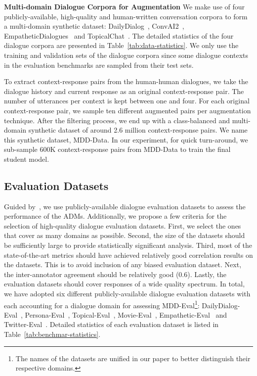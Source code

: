 \documentclass[letterpaper]{article} \usepackage{aaai22}  \usepackage{times}  \usepackage{helvet}  \usepackage{courier}  \usepackage[hyphens]{url}  \usepackage{graphicx} \urlstyle{rm} \def\UrlFont{\rm}  \usepackage{natbib}  \usepackage{caption} \DeclareCaptionStyle{ruled}{labelfont=normalfont,labelsep=colon,strut=off} \frenchspacing  \setlength{\pdfpagewidth}{8.5in}  \setlength{\pdfpageheight}{11in}  \usepackage{algorithm}
\begin{document}
\bigskip
\noindent\textbf{Multi-domain Dialogue Corpora for Augmentation}
We make use of four publicly-available, high-quality and human-written conversation corpora to form a multi-domain synthetic dataset: DailyDialog~\citep{li-etal-2017-dailydialog}, ConvAI2~\citep{dinan2020second}, EmpatheticDialogues~\citep{rashkin-etal-2019-towards} and TopicalChat~\citep{gopalakrishnan2019topical}. The detailed statistics of the four dialogue corpora are presented in Table~\ref{tab:data-statistics}.  We only use the training and validation sets of the dialogue corpora since some dialogue contexts in the evaluation benchmarks are sampled from their test sets.

To extract context-response pairs from the human-human dialogues, we take the dialogue history and current response as an original context-response pair. The number of utterances per context is kept between one and four. For each original context-response pair, we sample ten different augmented pairs per augmentation technique. After the filtering process, we end up with a class-balanced and multi-domain synthetic dataset of around 2.6 million context-response pairs. We name this synthetic dataset, MDD-Data. In our experiment, for quick turn-around, we sub-sample 600K context-response pairs from MDD-Data to train the final student model. 

\subsection{Evaluation Datasets}
\label{subsec:benchmarks}
Guided by~\citep{yeh2021comprehensive}, we use publicly-available dialogue evaluation datasets to assess the performance of the ADMs. Additionally, we propose a few criteria for the selection of high-quality dialogue evaluation datasets. First, we select the ones that cover as many domains as possible. Second, the size of the datasets should be sufficiently large to provide statistically significant analysis. Third, most of the state-of-the-art metrics should have achieved relatively good correlation results on the datasets. This is to avoid inclusion of any biased evaluation dataset. Next, the inter-annotator agreement should be relatively good (0.6). Lastly, the evaluation datasets should cover responses of a wide quality spectrum. In total, we have adopted six different publicly-available dialogue evaluation datasets with each accounting for a dialogue domain for assessing MDD-Eval\footnote{The names of the datasets are unified in our paper to better distinguish their respective domains.}: DailyDialog-Eval~\citep{zhao-etal-2020-designing},  Persona-Eval~\citep{zhao-etal-2020-designing}, Topical-Eval~\citep{mehri-eskenazi-2020-usr}, Movie-Eval~\citep{app10030762}, Empathetic-Eval~\citep{huang-etal-2020-grade} and Twitter-Eval~\citep{hori2017end}. Detailed statistics of each evaluation dataset is listed in Table~\ref{tab:benchmar-statistics}.
\end{document}
